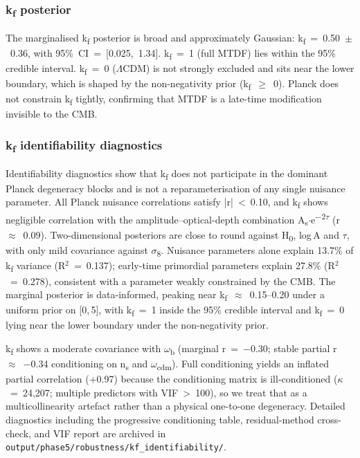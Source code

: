 \documentclass[11pt,a4paper]{article}
\begin{document}
\subsubsection{k\textsubscript{f} posterior}
The marginalised k\textsubscript{f} posterior is broad and approximately Gaussian: k\textsubscript{f}~=~0.50~$\pm$~0.36, with 95\%~CI~=~[0.025,~1.34]. k\textsubscript{f}~=~1 (full MTDF) lies within the 95\% credible interval. k\textsubscript{f}~=~0 ($\Lambda$CDM) is not strongly excluded and sits near the lower boundary, which is shaped by the non-negativity prior (k\textsubscript{f}~$\ge$~0). Planck does not constrain k\textsubscript{f} tightly, confirming that MTDF is a late-time modification invisible to the CMB.

\subsubsection{k\textsubscript{f} identifiability diagnostics}
Identifiability diagnostics show that k\textsubscript{f} does not participate in the dominant Planck degeneracy blocks and is not a reparameterisation of any single nuisance parameter. All Planck nuisance correlations satisfy |r|~<~0.10, and k\textsubscript{f} shows negligible correlation with the amplitude--optical-depth combination A\textsubscript{s}$\cdot$e\textsuperscript{$-$2$\tau$} (r~$\approx$~0.09). Two-dimensional posteriors are close to round against H\textsubscript{0}, log\,A and $\tau$, with only mild covariance against $\sigma$\textsubscript{8}. Nuisance parameters alone explain 13.7\% of k\textsubscript{f} variance (R$^{2}$~=~0.137); early-time primordial parameters explain 27.8\% (R$^{2}$~=~0.278), consistent with a parameter weakly constrained by the CMB. The marginal posterior is data-informed, peaking near k\textsubscript{f}~$\approx$~0.15--0.20 under a uniform prior on [0,\,5], with k\textsubscript{f}~=~1 inside the 95\% credible interval and k\textsubscript{f}~=~0 lying near the lower boundary under the non-negativity prior.

k\textsubscript{f} shows a moderate covariance with $\omega$\textsubscript{b} (marginal r~=~$-$0.30; stable partial r~$\approx$~$-$0.34 conditioning on n\textsubscript{s} and $\omega$\textsubscript{cdm}). Full conditioning yields an inflated partial correlation (+0.97) because the conditioning matrix is ill-conditioned ($\kappa$~=~24,207; multiple predictors with VIF~>~100), so we treat that as a multicollinearity artefact rather than a physical one-to-one degeneracy. Detailed diagnostics including the progressive conditioning table, residual-method cross-check, and VIF report are archived in \texttt{output/\allowbreak{}phase5/\allowbreak{}robustness/\allowbreak{}kf\_\allowbreak{}identifiability/\allowbreak{}}.
\end{document}
